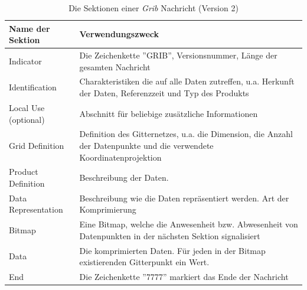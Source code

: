 \begin{table}
  \centering
  {\sf
    \footnotesize
    \begin{longtable}{@{}lp{10cm}@{}}

      \toprule
      \textbf{Name der Sektion} & \textbf{Verwendungszweck} \\

      \midrule

      Indicator & Die Zeichenkette ''GRIB'', Versionsnummer, Länge der gesamten Nachricht \\

      Identification & Charakteristiken die auf alle Daten zutreffen, u.a. Herkunft der Daten, Referenzzeit und Typ des Produkts \\

      Local Use (optional) & Abschnitt für beliebige zusätzliche Informationen \\

      Grid Definition &  Definition des Gitternetzes, u.a. die Dimension, die Anzahl der Datenpunkte und die verwendete Koordinatenprojektion \\

      Product Definition &  Beschreibung der Daten. \\

      Data Representation &  Beschreibung wie die Daten repräsentiert werden. Art der Komprimierung \\

      Bitmap & Eine Bitmap, welche die Anwesenheit bzw. Abwesenheit von Datenpunkten in der nächsten Sektion signalisiert \\

      Data &  Die komprimierten Daten. Für jeden in der Bitmap existierenden Gitterpunkt ein Wert. \\

      End & Die Zeichenkette ''7777'' markiert das Ende der Nachricht \\

      \bottomrule

    \end{longtable}
  }

  \caption{Die Sektionen einer \textit{Grib} Nachricht (Version 2)}
  \label{tab:grib}

\end{table}


